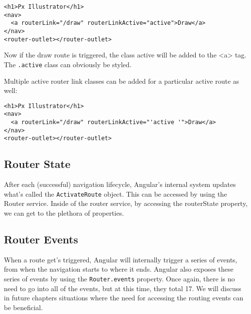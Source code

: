 \begin{lstlisting}
<h1>Px Illustrator</h1>
<nav>
  <a routerLink="/draw" routerLinkActive="active">Draw</a>
</nav>
<router-outlet></router-outlet>
\end{lstlisting}

Now if the draw route is triggered, the class active will 
be added to the <a> tag. The \lstinline{.active} class 
can obviously be styled.

Multiple active router link classes can be added for a 
particular active route as well: 

\begin{lstlisting}
<h1>Px Illustrator</h1>
<nav>
  <a routerLink="/draw" routerLinkActive="'active '">Draw</a>
</nav>
<router-outlet></router-outlet>
\end{lstlisting}

\subsection{ Router State }
After each (successful) navigation lifecycle, Angular's internal system 
updates what's called the \lstinline{ActivateRoute} object. This can be
accessed by using the Router service. Inside of the router service, by 
accessing the routerState property, we can get to the plethora of 
properties.
\\

\subsection{ Router Events }
When a route get's triggered, Angular will internally trigger a series 
of events, from when the navigation starts to where it ends. Angular 
also exposes these series of events by using the \lstinline{Router.events}
property. Once again, there is no need to go into all of the events, but 
at this time, they total 17. We will discuss in future chapters situations 
where the need for accessing the routing events can be beneficial. 
